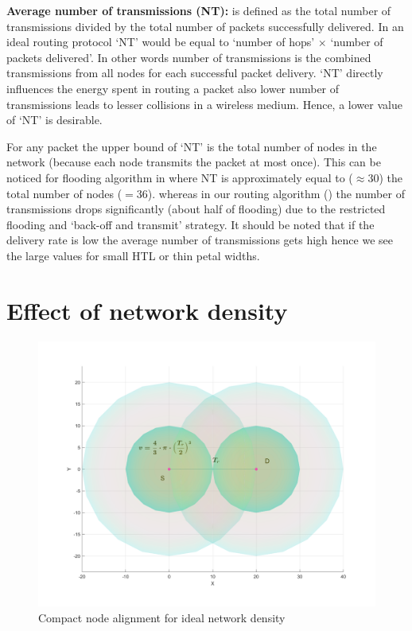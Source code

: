 \textbf{Average number of transmissions (NT):} is defined as the total number of transmissions divided by the total number of packets successfully delivered. In an ideal routing protocol `NT' would be equal to `number of hops' $\times$ `number of packets delivered'. In other words number of transmissions is the combined transmissions from all nodes for each successful packet delivery. `NT' directly influences the energy spent in routing a packet also lower number of transmissions leads to lesser collisions in a wireless medium. Hence, a lower value of `NT' is desirable. 

For any packet the upper bound of `NT' is the total number of nodes in the network (because each node transmits the packet at most once). This can be noticed for flooding algorithm in  where NT is approximately equal to ($ \approx 30$) the total number of nodes ($ = 36$). whereas in our routing algorithm () the number of transmissions drops significantly (about half of flooding) due to the restricted flooding and `back-off and transmit' strategy. It should be noted that if the delivery rate is low the average number of transmissions gets high hence we see the large values for small HTL or thin petal widths.

\section{Effect of network density}

\begin{figure}[hbtp]
\centering
\includegraphics[width=\simResultFigSize\textwidth]{ncsuthesis-0.6/Chapter-5/figs/nodeDensity}
\caption{Compact node alignment for ideal network density}
\label{fig:node_density}
\end{figure}

